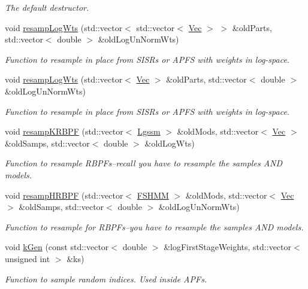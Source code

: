 \begin{DoxyCompactItemize}
\begin{DoxyCompactList}\small\item\em The default destructor. \end{DoxyCompactList}\item 
void \hyperlink{classMultinomResamp_a0ea6269180faf0b0613072d9bc8a7b53}{resamp\+Log\+Wts} (std\+::vector$<$ std\+::vector$<$ \hyperlink{apf__filter_8h_a4c7df05c6f5e8a0d15ae14bcdbc07152}{Vec} $>$ $>$ \&old\+Parts, std\+::vector$<$ double $>$ \&old\+Log\+Un\+Norm\+Wts)
\begin{DoxyCompactList}\small\item\em Function to resample in place from S\+I\+S\+Rs or A\+P\+FS with weights in log-\/space. \end{DoxyCompactList}\item 
void \hyperlink{classMultinomResamp_afd01aa78b0e2c0112c6af41164bc1e2b}{resamp\+Log\+Wts} (std\+::vector$<$ \hyperlink{apf__filter_8h_a4c7df05c6f5e8a0d15ae14bcdbc07152}{Vec} $>$ \&old\+Parts, std\+::vector$<$ double $>$ \&old\+Log\+Un\+Norm\+Wts)
\begin{DoxyCompactList}\small\item\em Function to resample in place from S\+I\+S\+Rs or A\+P\+FS with weights in log-\/space. \end{DoxyCompactList}\item 
void \hyperlink{classMultinomResamp_a67ded8594a810950febe37a44e2a8a82}{resamp\+K\+R\+B\+PF} (std\+::vector$<$ \hyperlink{classLgssm}{Lgssm} $>$ \&old\+Mods, std\+::vector$<$ \hyperlink{apf__filter_8h_a4c7df05c6f5e8a0d15ae14bcdbc07152}{Vec} $>$ \&old\+Samps, std\+::vector$<$ double $>$ \&old\+Log\+Wts)
\begin{DoxyCompactList}\small\item\em Function to resample R\+B\+P\+Fs--recall you have to resample the samples A\+ND models. \end{DoxyCompactList}\item 
void \hyperlink{classMultinomResamp_afe270f582430874e2a45c63eb7e0fe04}{resamp\+H\+R\+B\+PF} (std\+::vector$<$ \hyperlink{classFSHMM}{F\+S\+H\+MM} $>$ \&old\+Mods, std\+::vector$<$ \hyperlink{apf__filter_8h_a4c7df05c6f5e8a0d15ae14bcdbc07152}{Vec} $>$ \&old\+Samps, std\+::vector$<$ double $>$ \&old\+Log\+Un\+Norm\+Wts)
\begin{DoxyCompactList}\small\item\em Function to resample for R\+B\+P\+Fs--you have to resample the samples A\+ND models. \end{DoxyCompactList}\item 
void \hyperlink{classMultinomResamp_a8112ff1114963723e24a1eed4a9f3efb}{k\+Gen} (const std\+::vector$<$ double $>$ \&log\+First\+Stage\+Weights, std\+::vector$<$ unsigned int $>$ \&ks)
\begin{DoxyCompactList}\small\item\em Function to sample random indices. Used inside A\+P\+Fs. \end{DoxyCompactList}\end{DoxyCompactItemize}


